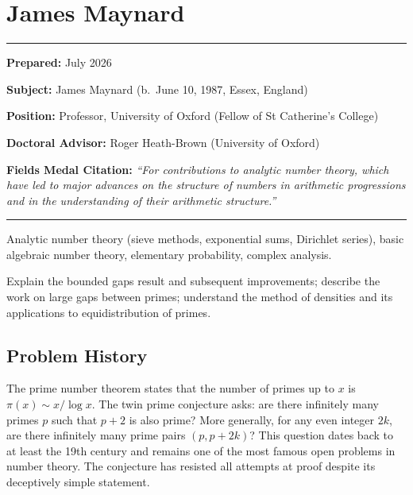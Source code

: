 \chapter{James Maynard}\label{ch2022jamesmaynard:james-maynard-fields-medal-2022-a-comprehensive-report-on-his-work-and-impact}

\begin{center}\rule{0.5\linewidth}{0.5pt}\end{center}

\textbf{Prepared:} July 2026

\textbf{Subject:} James Maynard (b.\ June 10, 1987, Essex, England)

\textbf{Position:} Professor, University of Oxford (Fellow of St Catherine's College)

\textbf{Doctoral Advisor:} Roger Heath-Brown (University of Oxford)

\textbf{Fields Medal Citation:} \emph{``For contributions to analytic number theory, which have led to major advances on the structure of numbers in arithmetic progressions and in the understanding of their arithmetic structure.''}

\begin{center}\rule{0.5\linewidth}{0.5pt}\end{center}

\begin{prereqs}
Analytic number theory (sieve methods, exponential sums, Dirichlet series), basic algebraic number theory, elementary probability, complex analysis.
\end{prereqs}

\begin{objectives}
Explain the bounded gaps result and subsequent improvements; describe the work on large gaps between primes; understand the method of densities and its applications to equidistribution of primes.
\end{objectives}

\section{Problem History}

The prime number theorem states that the number of primes up to $x$ is $\pi(x) \sim x/\log x$. The twin prime conjecture asks: are there infinitely many primes $p$ such that $p+2$ is also prime? More generally, for any even integer $2k$, are there infinitely many prime pairs $(p, p+2k)$? This question dates back to at least the 19th century and remains one of the most famous open problems in number theory. The conjecture has resisted all attempts at proof despite its deceptively simple statement.

